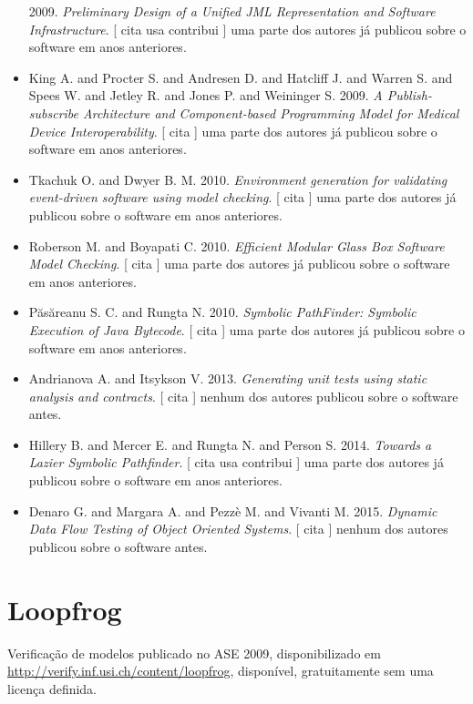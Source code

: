 \begin{itemize}
      2009.
        \textit{ Preliminary Design of a Unified JML Representation and Software Infrastructure}.
      [
          cita
          usa
          contribui
      ]
uma parte dos autores já publicou sobre o software em anos anteriores.
\item King A. and Procter S. and Andresen D. and Hatcliff J. and Warren S. and Spees W. and Jetley R. and Jones P. and Weininger S.
      2009.
        \textit{ A Publish-subscribe Architecture and Component-based Programming Model for Medical Device Interoperability}.
      [
          cita
      ]
uma parte dos autores já publicou sobre o software em anos anteriores.
\item Tkachuk O. and Dwyer B. M.
      2010.
        \textit{ Environment generation for validating event-driven software using model checking}.
      [
          cita
      ]
uma parte dos autores já publicou sobre o software em anos anteriores.
\item Roberson M. and Boyapati C.
      2010.
        \textit{ Efficient Modular Glass Box Software Model Checking}.
      [
          cita
      ]
uma parte dos autores já publicou sobre o software em anos anteriores.
\item P\u{a}s\u{a}reanu S. C. and Rungta N.
      2010.
        \textit{ Symbolic PathFinder: Symbolic Execution of Java Bytecode}.
      [
          cita
      ]
uma parte dos autores já publicou sobre o software em anos anteriores.
\item Andrianova A. and Itsykson V.
      2013.
        \textit{ Generating unit tests using static analysis and contracts}.
      [
          cita
      ]
nenhum dos autores publicou sobre o software antes.
\item Hillery B. and Mercer E. and Rungta N. and Person S.
      2014.
        \textit{ Towards a Lazier Symbolic Pathfinder}.
      [
          cita
          usa
          contribui
      ]
uma parte dos autores já publicou sobre o software em anos anteriores.
\item Denaro G. and Margara A. and Pezzè M. and Vivanti M.
      2015.
        \textit{ Dynamic Data Flow Testing of Object Oriented Systems}.
      [
          cita
      ]
nenhum dos autores publicou sobre o software antes.
\end{itemize}
\section{Loopfrog}

Verificação de modelos
publicado no ASE 2009,
disponibilizado em \url{http://verify.inf.usi.ch/content/loopfrog},
disponível,
gratuitamente
sem uma licença definida.

